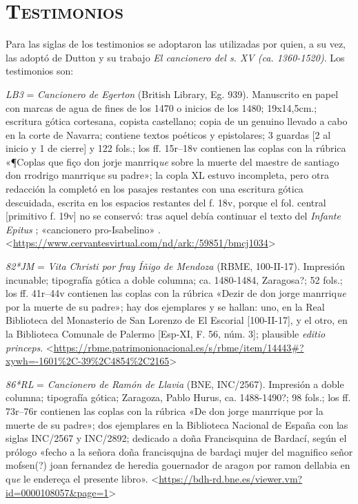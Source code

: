 \documentclass[11pt,a4paper,twoside]{article}
\newcommand{\comillas}[1]{«#1»}
\newcommand{\eg}{{\emph{LB3}}}
\newcommand{\jm}{\emph{82*JM}}
\newcommand{\rl}{\emph{86*RL}}
\begin{document}
\section*{\centering \textsc{Testimonios}}
%
Para las siglas de los testimonios se adoptaron las utilizadas por \textcite{PérezPriego2017} quien, a su vez, 
las adoptó de Dutton y su trabajo \emph{El cancionero del s. XV (ca. 1360-1520)}. Los testimonios son:\par
%
{\eg} = \emph{Cancionero de Egerton} (British Library, Eg. 939).
%
Manuscrito en papel con marcas de agua de fines de los 1470 o inicios de los 1480; 19x14,5cm.; escritura gótica cortesana, copista castellano; copia de un genuino llevado a cabo en la corte de Navarra; contiene textos poéticos y epistolares; 3 guardas [2 al inicio y 1 de cierre] y 122 fols.; los ff. 15r--18v contienen las coplas con la rúbrica \comillas{¶Coplas que fiço don jorje manrriq\emph{ue} sobre la muerte del maestre de santiago don rrodrigo manrriq\emph{ue} su padre}; la copla XL estuvo incompleta, pero otra redacción la completó en los pasajes restantes con una escritura gótica descuidada, escrita en los espacios restantes del f. 18v, porque el fol. central [primitivo f. 19v] no se conservó: tras aquel debía continuar el texto del \emph{Infante Epitus} \textcite{Beltrán2011}; \comillas{cancionero pro-Isabelino} \parencite{Severin2000}. <\url{https://www.cervantesvirtual.com/nd/ark:/59851/bmcj1034}>\par

{\jm} = \emph{Vita Christi por fray Íñigo de Mendoza} (RBME, 100-II-17).
%
Impresión incunable; tipografía gótica a doble columna; ca. 1480-1484, Zaragosa?; 52 fols.; los ff. 41r--44v contienen las coplas con la rúbrica \comillas{Dezir de don jorge manrriq\emph{ue} por la muerte de su padre}; hay dos ejemplares y se hallan: uno, en la Real Biblioteca del Monasterio de San Lorenzo de El Escorial [100-II-17], y el otro, en la Biblioteca Comunale de Palermo [Esp-XI, F. 56, núm. 3]; plausible \emph{editio princeps}. <\url{https://rbme.patrimonionacional.es/s/rbme/item/14443#?xywh=-1601%2C-39%2C4854%2C2165}>\par

{\rl} = \emph{Cancionero de Ramón de Llavia} (BNE, INC/2567).
%
Impresión a doble columna; tipografía gótica; Zaragoza, Pablo Hurus, ca. 1488-1490?; 98 fols.; los ff. 73r--76r contienen las coplas con la rúbrica \comillas{De don jorge manrrique por la muerte de su padre}; dos ejemplares en la Biblioteca Nacional de España con las siglas INC/2567 y INC/2892; dedicado a doña Francisquina de Bardací, según el prólogo \comillas{fecho a la señora doña francisqujna de bardaçi mujer del magnifico señor mofsen(?) joan fernandez de heredia gouernador de arago\emph{n} por ramon dellabia en q\emph{ue} le endereça el presente libro}. <\url{https://bdh-rd.bne.es/viewer.vm?id=0000108057&page=1}>\par
\end{document}
